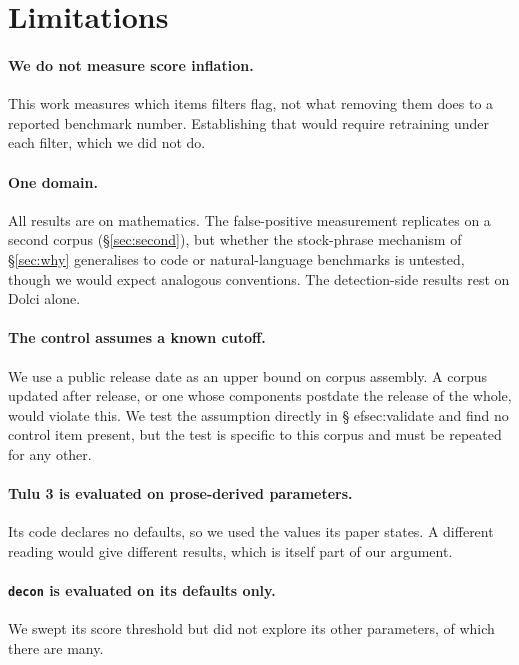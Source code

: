 \documentclass[11pt]{article}
\begin{document}
\section{Limitations}
\label{sec:limits}

\paragraph{We do not measure score inflation.} This work measures which items
filters flag, not what removing them does to a reported benchmark number.
Establishing that would require retraining under each filter, which we did not do.

\paragraph{One domain.} All results are on mathematics. The false-positive
measurement replicates on a second corpus (\S\ref{sec:second}), but whether the
stock-phrase mechanism of \S\ref{sec:why} generalises to code or natural-language
benchmarks is untested, though we would expect analogous conventions. The
detection-side results rest on Dolci alone.

\paragraph{The control assumes a known cutoff.} We use a public release date as an
upper bound on corpus assembly. A corpus updated after release, or one whose
components postdate the release of the whole, would violate this. We test the
assumption directly in \S
ef{sec:validate} and find no control item present, but
the test is specific to this corpus and must be repeated for any other.

\paragraph{Tulu 3 is evaluated on prose-derived parameters.} Its code declares no
defaults, so we used the values its paper states. A different reading would give
different results, which is itself part of our argument.

\paragraph{\texttt{decon} is evaluated on its defaults only.} We swept its score
threshold but did not explore its other parameters, of which there are many.
\end{document}
